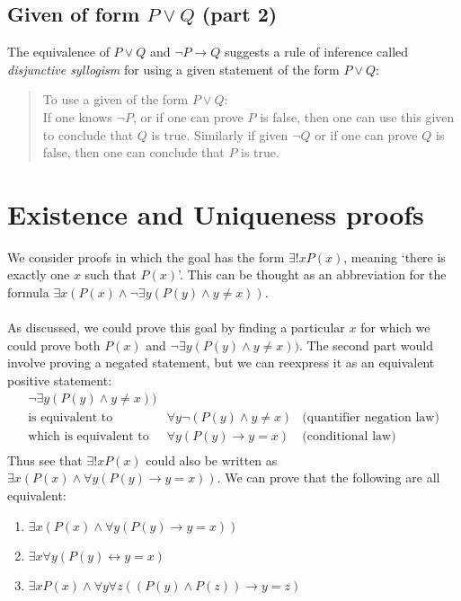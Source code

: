 \documentclass{report}
\theoremstyle{definition}
\begin{document}
\subsection{Given of form $P\lor Q$ (part 2)}
The equivalence of $P\lor Q$ and $\neg P\to Q$ suggests a rule of inference called \textit{disjunctive syllogism} for using a given statement of the form $P\lor Q$:
\begin{quote}
To use a given of the form $P\lor Q$:\\
If one knows $\neg P$, or if one can prove $P$ is false, then one can use this given to conclude that $Q$ is true. Similarly if given $\neg Q$ or if one can prove $Q$ is false, 
then one can conclude that $P$ is true.
\end{quote}
\newpage

\section{Existence and Uniqueness proofs}
We consider proofs in which the goal has the form $\exists!xP(x)$, meaning `there is exactly one $x$ such that $P(x)$'. This can be thought as an abbreviation for the formula 
$\exists x(P(x)\land\neg\exists y(P(y)\land y\neq x))$.\\
\vspace{1mm}\\
As discussed, we could prove this goal by finding a particular $x$ for which we could prove both $P(x)$ and $\neg\exists y(P(y)\land y\neq x))$. The second part would involve proving a negated
statement, but we can reexpress it as an equivalent positive statement:
\begin{align*}
\neg\exists y(P(y)\land y\neq x))&\\
\text{is equivalent to }&\forall y\neg(P(y)\land y\neq x)&\text{(quantifier negation law)}\\
\text{which is equivalent to }&\forall y(P(y)\to y=x)&\text{(conditional law)}\\
\end{align*}
Thus see that $\exists!xP(x)$ could also be written as $\exists x(P(x)\land\forall y(P(y)\to y=x))$. 
We can prove that the following are all equivalent:
\begin{enumerate}
\item$\exists x(P(x)\land\forall y(P(y)\to y=x))$
\item$\exists x\forall y(P(y)\leftrightarrow y=x)$
\item$\exists xP(x)\land\forall y\forall z((P(y)\land P(z))\to y=z)$ 
\end{enumerate}
\end{document}
